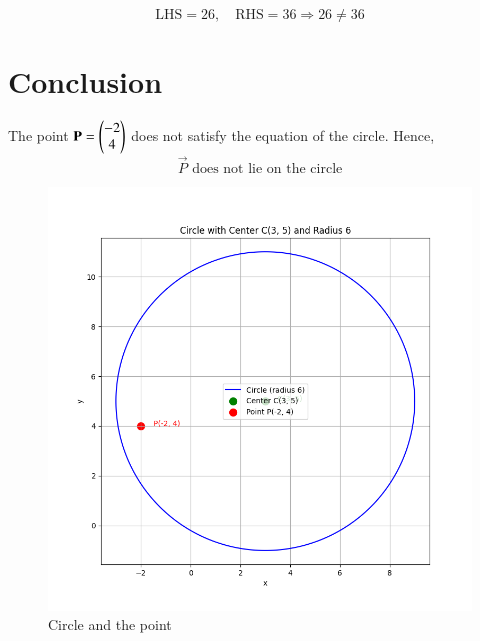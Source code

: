 \documentclass[journal]{IEEEtran}
\begin{document}
\[
\text{LHS} = 26, \quad \text{RHS} = 36
\Rightarrow 26 \ne 36
\]

\section*{\large\textbf{Conclusion}}
\vspace{0.5cm}

The point \( \mathbf{P} = \begin{pmatrix}-2 \\ 4\end{pmatrix} \) does not satisfy the equation of the circle.  
Hence,  
\[
\boxed{\vec{P} \text{ does not lie on the circle}}
\]


\begin{figure}[h!t]
\centering
\includegraphics[width=0.9\linewidth]{Figs/Fig1.png}
\caption{Circle and the point}
\end{figure}
\end{document}
